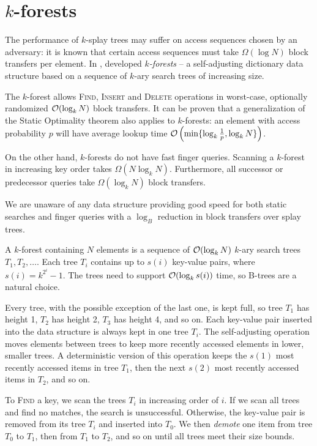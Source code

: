 \chapter{$k$-forests}
\label{chapter:kforest}
The performance of $k$-splay trees may suffer on access sequences chosen
by an adversary: it is known that certain access sequences must
take $\Omega(\log N)$ block transfers per element.
In \citeyear{martel}, \citeauthor{martel} developed \emph{$k$-forests} --
a self-adjusting dictionary data structure based on a sequence of
$k$-ary search trees of increasing size.

The $k$-forest allows \textsc{Find}, \textsc{Insert} and \textsc{Delete}
operations in worst-case, optionally randomized $\mathcal{O}(\log_k N)$ block transfers.
It can be proven that a generalization of the Static Optimality theorem
also applies to $k$-forests: an element with access probability $p$
will have average lookup time $\mathcal{O}\left(\min\{\log_k \frac{1}{p}, \log_k
N\}\right)$.


On the other hand, $k$-forests do not have fast finger queries. Scanning
a $k$-forest in increasing key order takes $\Omega(N\log_k N)$. Furthermore,
all successor or predecessor queries take $\Omega(\log_k N)$ block transfers.

We are unaware of any data structure providing good speed for both static
searches and finger queries with a $\log_B$ reduction in block transfers
over splay trees.

A $k$-forest containing $N$ elements is a sequence of $\mathcal{O}(\log_k N)$ $k$-ary
search trees $T_1, T_2, \ldots$. Each tree $T_i$ contains up to $s(i)$ key-value
pairs, where $s(i) = k^{2^i} - 1$. The trees need to support $\mathcal{O}(\log_k s(i))$
time, so B-trees are a natural choice.

Every tree, with the possible exception of the last one, is kept full,
so tree $T_1$ has height 1, $T_2$ has height 2, $T_3$ has height 4, and so on.
Each key-value pair inserted into the data structure is always kept in one
tree $T_i$. The self-adjusting operation moves elements between trees to
keep more recently accessed elements in lower, smaller trees.
A deterministic version of this operation keeps the $s(1)$ most recently
accessed items in tree $T_1$, then the next $s(2)$ most recently accessed
items in $T_2$, and so on.

To \textsc{Find} a key, we scan the trees $T_i$ in increasing order of $i$.
If we scan all trees and find no matches, the search is unsuccessful.
Otherwise, the key-value pair is removed from its tree $T_i$ and inserted
into $T_0$. We then \emph{demote} one item from tree $T_0$ to $T_1$,
then from $T_1$ to $T_2$, and so on until all trees meet their size bounds.

